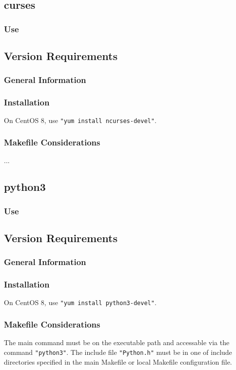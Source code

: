 \documentclass{article}
\begin{document}
\subsection{curses}
\subsubsection{Use}
\subsection{Version Requirements}
\subsubsection{General Information}
\subsubsection{Installation}
On CentOS 8, use {\tt "yum install ncurses-devel"}.
\subsubsection{Makefile Considerations}
...

\subsection{python3}
\subsubsection{Use}
\subsection{Version Requirements}
\subsubsection{General Information}
\subsubsection{Installation}
On CentOS 8, use {\tt "yum install python3-devel"}.
\subsubsection{Makefile Considerations}
The main command must be on the executable path and accessable
via the command \texttt{"python3"}.
The include file \texttt{"Python.h"} must be in one of
include directories specified in the main Makefile or local Makefile
configuration file.
\end{document}

